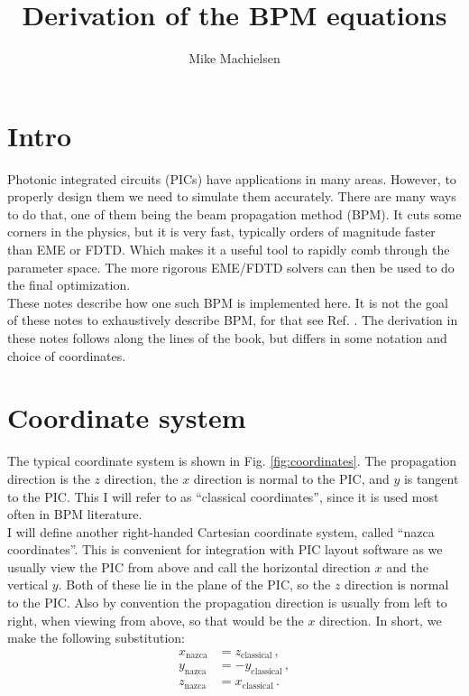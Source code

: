 \documentclass[]{article}
\title{Derivation of the BPM equations}
\author{Mike Machielsen}
\begin{document}
	
	\maketitle
	
	
	\section{Intro}
	Photonic integrated circuits (PICs) have applications in many areas. However, to properly design them we need to simulate them accurately. There are many ways to do that, one of them being the beam propagation method (BPM). It cuts some corners in the physics, but it is very fast, typically orders of magnitude faster than EME or FDTD. Which makes it a useful tool to rapidly comb through the parameter space. The more rigorous EME/FDTD solvers can then be used to do the final optimization.\\	
	
	These notes describe how one such BPM is implemented here. It is not the goal of these notes to exhaustively describe BPM, for that see Ref. \cite{Lifante_2015}. The derivation in these notes follows along the lines of the book, but differs in some notation and choice of coordinates. %
	
	\section{Coordinate system}
	The typical coordinate system is shown in Fig. \ref{fig:coordinates}. The propagation direction is the $z$ direction, the $x$ direction is normal to the PIC, and $y$ is tangent to the PIC. This I will refer to as ``classical coordinates'', since it is used most often in BPM literature.\\
	
	I will define another right-handed Cartesian coordinate system, called ``nazca coordinates''. This is convenient for integration with PIC layout software as we usually view the PIC from above and call the horizontal direction $x$ and the vertical $y$. Both of these lie in the plane of the PIC, so the $z$ direction is normal to the PIC. Also by convention the propagation direction is usually from left to right, when viewing from above, so that would be the $x$ direction. In short, we make the following substitution:
	\begin{subequations}
		\begin{align}
			x_\text{nazca} &= z_\text{classical}\, ,\\
			y_\text{nazca} &= -y_\text{classical}\, , \\
			z_\text{nazca} &= x_\text{classical}\, .
		\end{align}
	\end{subequations}
	
\end{document}
